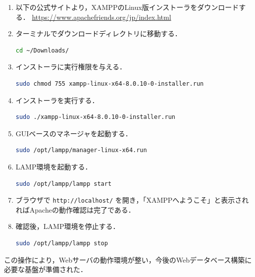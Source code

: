 \begin{enumerate}
  \item 以下の公式サイトより，XAMPPのLinux版インストーラをダウンロードする．
        \url{https://www.apachefriends.org/jp/index.html}

  \item ターミナルでダウンロードディレクトリに移動する．
        \begin{lstlisting}[language=bash]
cd ~/Downloads/
\end{lstlisting}

  \item インストーラに実行権限を与える．
        \begin{lstlisting}[language=bash]
sudo chmod 755 xampp-linux-x64-8.0.10-0-installer.run
\end{lstlisting}

  \item インストーラを実行する．
        \begin{lstlisting}[language=bash]
sudo ./xampp-linux-x64-8.0.10-0-installer.run
\end{lstlisting}

  \item GUIベースのマネージャを起動する．
        \begin{lstlisting}[language=bash]
sudo /opt/lampp/manager-linux-x64.run
\end{lstlisting}

  \item LAMP環境を起動する．
        \begin{lstlisting}[language=bash]
sudo /opt/lampp/lampp start
\end{lstlisting}

  \item ブラウザで \texttt{http://localhost/} を開き，「XAMPPへようこそ」と表示されればApacheの動作確認は完了である．

  \item 確認後，LAMP環境を停止する．
        \begin{lstlisting}[language=bash]
sudo /opt/lampp/lampp stop
\end{lstlisting}


\end{enumerate}

この操作により，Webサーバの動作環境が整い，今後のWebデータベース構築に必要な基盤が準備された．

